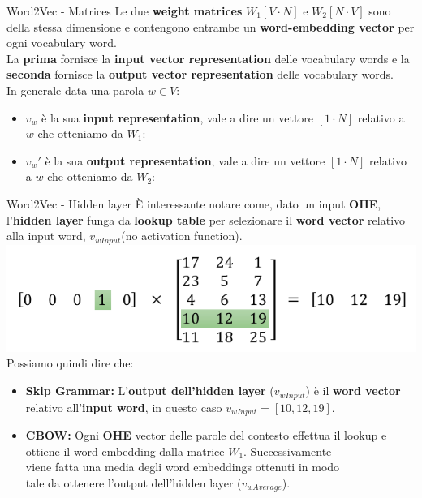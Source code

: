 \documentclass[british]{beamer}
\begin{document}
\begin{frame}{Word2Vec - Matrices}
	Le due \textbf{weight matrices} \(W_1 [V\cdot N]\) e \(W_2 [N\cdot V]\) sono della stessa dimensione e contengono entrambe un \textbf{word-embedding vector} per ogni vocabulary word.\\
	La \textbf{prima} fornisce la \textbf{\alert{input vector representation}} delle vocabulary words e la \textbf{seconda} fornisce la \textbf{\alert{output vector representation}} delle vocabulary words.\\
	In generale data una parola \(w \in V\):
	\begin{itemize}
		\item \(v_w\) \`{e} la sua \textbf{input representation}, vale a dire un vettore \([1 \cdot N]\) relativo a \(w\) che otteniamo da \(W_1\):
		\item \(v_w'\) \`{e} la sua \textbf{output representation}, vale a dire un vettore \([1 \cdot N]\) relativo a \(w\) che otteniamo da \(W_2\):
	\end{itemize}
\end{frame}

\begin{frame}{Word2Vec - Hidden layer}
	\`{E} interessante notare come, dato un input \textbf{OHE}, l'\textbf{hidden layer} funga da \textbf{lookup table} per selezionare il \textbf{word vector} relativo alla input word, \(v_{wInput}\)(no activation function).
	\includegraphics[width=1\linewidth,height=0.25\textwidth]{./Imgs/lookup_table}\\
	Possiamo quindi dire che:
	\begin{itemize}
		\item \textbf{Skip Grammar: }L'\textbf{output dell'hidden layer} (\(v_{wInput}\)) \`{e} il \textbf{word vector} relativo all'\textbf{input word}, in questo caso \(v_{wInput} = [10, 12, 19]\).
		\item \textbf{CBOW: }Ogni \textbf{OHE} vector delle parole del contesto effettua il lookup e ottiene il word-embedding dalla matrice \(W_1\). Successivamente\\ viene fatta una media degli word embeddings ottenuti in modo\\ tale da ottenere l'output dell'hidden layer (\(v_{wAverage}\)).
	\end{itemize}
\end{frame}
\end{document}
